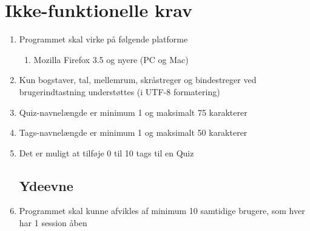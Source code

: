 \section{Ikke-funktionelle krav}
\label{sec:nonFunctional}
\begin{enumerate}
	\subsection*{Brugbarhed}
	\item Programmet skal virke på følgende platforme
	\begin{enumerate}
		\item Mozilla Firefox 3.5 og nyere (PC og Mac)
	\end{enumerate}
	
	\item Kun bogstaver, tal, mellemrum, skråstreger og bindestreger ved brugerindtastning understøttes (i UTF-8 formatering)
	\item Quiz-navnelængde er minimum 1 og maksimalt 75 karakterer
	\item Tags-navnelængde er minimum 1 og maksimalt 50 karakterer 
	\item Det er muligt at tilføje 0 til 10 tags til en Quiz
	\subsection*{Ydeevne}
	\item Programmet skal kunne afvikles af minimum 10 samtidige brugere, som hver har 1 session åben
\end{enumerate}